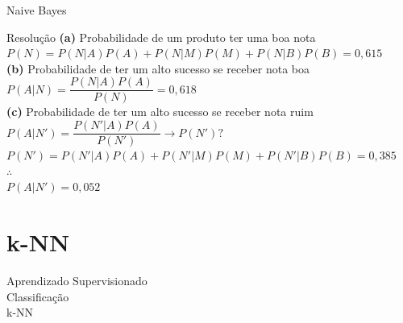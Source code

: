 \documentclass{libs/ufc_format}
\begin{document}
\begin{frame}{Naive Bayes}
    \begin{exampleblock}{Resolução}
        \textbf{(a)} Probabilidade de um produto ter uma boa nota\\
        $P(N) = P(N|A)P(A) + P(N|M)P(M) + P(N|B)P(B) = 0,615$\\
        \vspace{0.5cm}
        \textbf{(b)} Probabilidade de ter um alto sucesso se receber nota boa\\
        $P(A|N) = \dfrac{P(N|A)P(A)}{P(N)} = 0,618$\\
        \vspace{0.5cm}
        \textbf{(c)} Probabilidade de ter um alto sucesso se receber nota ruim\\
        $P(A|N') = \dfrac{P(N'|A)P(A)}{P(N')} \rightarrow P(N')?$\\
        $P(N') = P(N'|A)P(A) + P(N'|M)P(M) + P(N'|B)P(B) = 0,385$\\
        $\therefore$\\
        $P(A|N') = 0,052$
    \end{exampleblock}
\end{frame}

\section{k-NN}

\begin{frame}{}
    \centering
    \LARGE
    Aprendizado Supervisionado\\
    \vspace{0.5cm}
    \LARGE
    Classificação\\
    \vspace{0.5cm}
    \Large
    k-NN
\end{frame}
\end{document}
